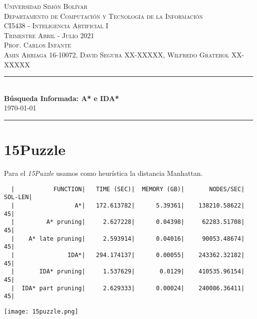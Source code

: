 \documentclass[a4paper,10pt]{article}
\date{}
\newcommand{\HRule}{\rule{\linewidth}{0.5mm}}
\begin{document}
\begin{center}
  \textsc {
    Universidad Simón Bolívar \\[0cm]
    Departamento de Computaci\'on y Tecnolog\'ia de la Informaci\'on \\[0cm]
    CI5438 - Inteligencia Artificial I \\[0cm]
    Trimestre Abril - Julio 2021 \\[0cm]
    Prof. Carlos Infante \\[0cm]
    Amin Arriaga 16-10072, David Segura XX-XXXXX, Wilfredo Graterol XX-XXXXX
  }
  \HRule \\[0.4cm]
  {\Large \textbf{B\'usqueda Informada: A* e IDA*}} \\[0.4cm]
  \textsc{
    \today
  }
  \HRule
\end{center}

\section{15Puzzle}
  Para el \textit{15Puzzle} usamos como heur\'istica la distancia Manhattan.

\begin{verbatim}
  |           FUNCTION|   TIME (SEC)|  MEMORY (GB)|       NODES/SEC|    SOL-LEN|
  |                 A*|   172.613782|      5.39361|    138210.58622|         45|
  |         A* pruning|     2.627228|      0.04398|     62283.51708|         45|
  |    A* late pruning|     2.593914|      0.04016|     90053.48674|         45|
  |               IDA*|   294.174137|      0.00055|    243362.32182|         45|
  |       IDA* pruning|     1.537629|       0.0129|    410535.96154|         45|
  |  IDA* part pruning|     2.629333|      0.00024|    240086.36411|         45|
\end{verbatim}     
\begin{figure*}[h!]
  \centering
  \texttt{[image: 15puzzle.png]}
\end{figure*}                                                                                
\end{document}
